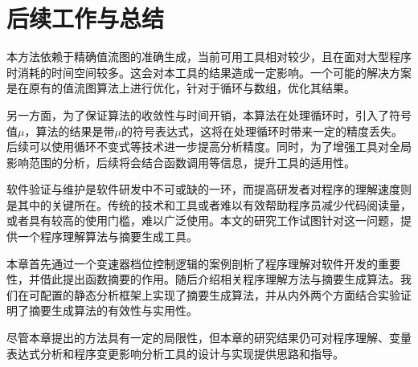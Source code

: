 \section{后续工作与总结}

本方法依赖于精确值流图的准确生成，当前可用工具相对较少，且在面对大型程序时消耗的时间空间较多。这会对本工具的结果造成一定影响。一个可能的解决方案是在原有的值流图算法上进行优化，针对于循环与数组，优化其结果。

另一方面，为了保证算法的收敛性与时间开销，本算法在处理循环时，引入了符号值$ \mu $，算法的结果是带$ \mu $的符号表达式，这将在处理循环时带来一定的精度丢失。后续可以使用循环不变式等技术进一步提高分析精度。同时，为了增强工具对全局影响范围的分析，后续将会结合函数调用等信息，提升工具的适用性。

软件验证与维护是软件研发中不可或缺的一环，而提高研发者对程序的理解速度则是其中的关键所在。传统的技术和工具或者难以有效帮助程序员减少代码阅读量，或者具有较高的使用门槛，难以广泛使用。本文的研究工作试图针对这一问题，提供一个程序理解算法与摘要生成工具。

本章首先通过一个变速器档位控制逻辑的案例剖析了程序理解对软件开发的重要性，并借此提出函数摘要的作用。随后介绍相关程序理解方法与摘要生成算法。我们在可配置的静态分析框架上实现了摘要生成算法，并从内外两个方面结合实验证明了摘要生成算法的有效性与实用性。

尽管本章提出的方法具有一定的局限性，但本章的研究结果仍可对程序理解、变量表达式分析和程序变更影响分析工具的设计与实现提供思路和指导。